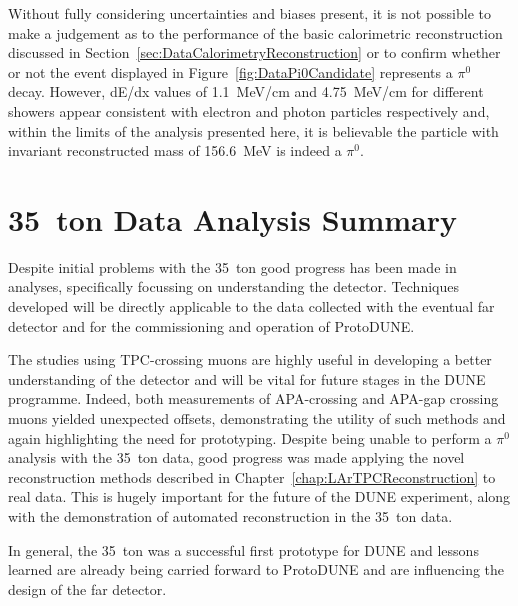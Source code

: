 Without fully considering uncertainties and biases present, it is not possible to make a judgement as to the performance of the basic calorimetric reconstruction discussed in Section~\ref{sec:DataCalorimetryReconstruction} or to confirm whether or not the event displayed in Figure~\ref{fig:DataPi0Candidate} represents a $\pi^0$ decay.  However, dE/dx values of 1.1~MeV/cm and 4.75~MeV/cm for different showers appear consistent with electron and photon particles respectively and, within the limits of the analysis presented here, it is believable the particle with invariant reconstructed mass of 156.6~MeV is indeed a $\pi^0$.

\section{35~ton Data Analysis Summary}\label{sec:35tonDataSummary}

Despite initial problems with the 35~ton good progress has been made in analyses, specifically focussing on understanding the detector.  Techniques developed will be directly applicable to the data collected with the eventual far detector and for the commissioning and operation of ProtoDUNE.

The studies using TPC-crossing muons are highly useful in developing a better understanding of the detector and will be vital for future stages in the DUNE programme.  Indeed, both measurements of APA-crossing and APA-gap crossing muons yielded unexpected offsets, demonstrating the utility of such methods and again highlighting the need for prototyping.  Despite being unable to perform a $\pi^0$ analysis with the 35~ton data, good progress was made applying the novel reconstruction methods described in Chapter~\ref{chap:LArTPCReconstruction} to real data.  This is hugely important for the future of the DUNE experiment, along with the demonstration of automated reconstruction in the 35~ton data.

In general, the 35~ton was a successful first prototype for DUNE and lessons learned are already being carried forward to ProtoDUNE and are influencing the design of the far detector.
